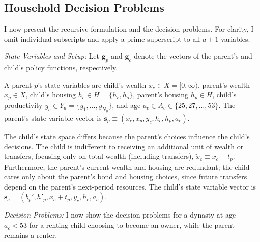 \documentclass[12pt]{article}
\begin{document}
\subsection{Household Decision Problems}
I now present the recursive formulation and the decision problems. For clarity, I omit individual subscripts and apply a prime superscript to all $a+1$ variables.

\textit{State Variables and Setup:} Let $\mathbf{g}_p$ and $\mathbf{g}_c$ denote the vectors of the parent's and child's policy functions, respectively.

A parent $p$'s state variables are child's wealth $x_c\in X=[0,\infty)$, parent's wealth $x_p\in X$, child's housing $h_c\in H = \{h_r,h_o\}$, parent's housing $h_p\in H$, child's productivity $y_c\in Y_a=\{y_1,\dots,y_{N_y}\}$, and age $a_c\in A_c\in\{25,27,\dots,53\}$. The parent's state variable vector is $\mathbf{s}_p\equiv\left(x_c,x_p,y_c,h_c,h_p,a_c\right)$. 

The child's state space differs because the parent's choices influence the child's decisions. The child is indifferent to receiving an additional unit of wealth or transfers, focusing only on total wealth (including transfers), $\tilde x_c\equiv x_c+t_p$. Furthermore, the parent's current wealth and housing are redundant; the child cares only about the parent's bond and housing choices, since future transfers depend on the parent’s next-period resources.  The child's state variable vector is $\mathbf{s}_c=\left(b_p',h'_p,x_c+t_p,y_c,h_c,a_c\right)$. 




\textit{Decision Problems:} 
I now show the decision problems for a dynasty at age $a_c < 53$ for a renting child choosing to become an owner, while the parent remains a renter. 
\end{document}
